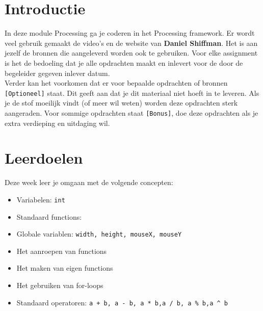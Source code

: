 \documentclass{../qh_exercise}
\begin{document}
\section{Introductie}
In deze module Processing ga je coderen in het Processing framework. Er wordt veel gebruik gemaakt de video's en de website van \textbf{Daniel Shiffman}. Het is aan jezelf de bronnen die aangeleverd worden ook te gebruiken. Voor elke assignment is het de bedoeling dat je alle opdrachten maakt en inlevert voor de door de begeleider gegeven inlever datum.\\
Verder kan het voorkomen dat er voor bepaalde opdrachten of bronnen \texttt{[Optioneel]} staat. Dit geeft aan dat je dit materiaal niet hoeft in te leveren. Als je de stof moeilijk vindt (of meer wil weten) worden deze opdrachten sterk aangeraden.
Voor sommige opdrachten staat \texttt{[Bonus]}, doe deze opdrachten als je extra verdieping en uitdaging wil.

\section{Leerdoelen}
Deze week leer je omgaan met de volgende concepten:
\begin{itemize}
    \item Variabelen: \texttt{int}
    \item Standaard functions: 
	\item Globale variablen: \texttt{width, height, mouseX, mouseY}     
    \item Het aanroepen van functions
    \item Het maken van eigen functions
    \item Het gebruiken van for-loops
    \item Standaard operatoren: \texttt{a + b, a - b, a * b,a / b, a \% b,a \textasciicircum{} b}
\end{itemize}
\end{document}
